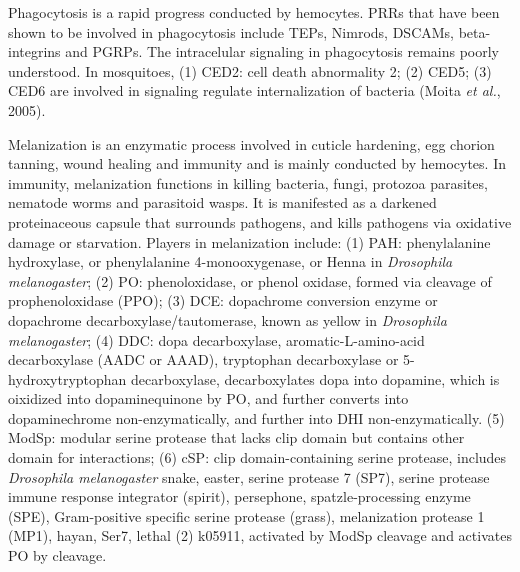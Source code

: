 \documentclass[11pt]{article}
\begin{document}
\begin{sloppypar}
Phagocytosis is a rapid progress conducted by hemocytes. 
PRRs that have been shown to be involved in phagocytosis include TEPs, Nimrods, DSCAMs, beta-integrins and PGRPs. 
The intracelular signaling in phagocytosis remains poorly understood. 
In mosquitoes, 
\newline
(1) CED2: cell death abnormality 2; \newline
(2) CED5; \newline
(3) CED6 \newline 
are involved in signaling regulate internalization of bacteria (Moita \textit{et al.}, 2005). 
\par
Melanization is an enzymatic process involved in cuticle hardening, egg chorion tanning, wound healing and immunity and is mainly conducted by hemocytes. 
In immunity, melanization functions in killing bacteria, fungi, protozoa parasites, nematode worms and parasitoid wasps. 
It is manifested as a darkened proteinaceous capsule that surrounds pathogens, and kills pathogens via oxidative damage or starvation. 
Players in melanization include:
\newline
(1) PAH: phenylalanine hydroxylase, or phenylalanine 4-monooxygenase, or Henna in \textit{Drosophila melanogaster}; \newline
(2) PO: phenoloxidase, or phenol oxidase, formed via cleavage of prophenoloxidase (PPO); \newline
(3) DCE: dopachrome conversion enzyme or dopachrome decarboxylase/tautomerase, known as yellow in \textit{Drosophila melanogaster}; \newline
(4) DDC: dopa decarboxylase, aromatic-L-amino-acid decarboxylase (AADC or AAAD), tryptophan decarboxylase or 5-hydroxytryptophan decarboxylase, decarboxylates dopa into dopamine, which is oixidized into dopaminequinone by PO, and further converts into dopaminechrome non-enzymatically, and further into DHI non-enzymatically. \newline 
(5) ModSp: modular serine protease that lacks clip domain but contains other domain for interactions; \newline
(6) cSP: clip domain-containing serine protease, includes \textit{Drosophila melanogaster} 
  snake, easter, serine protease 7 (SP7), serine protease immune response integrator (spirit), persephone, spatzle-processing enzyme (SPE), Gram-positive specific serine protease (grass), melanization protease 1 (MP1), hayan, Ser7, lethal (2) k05911, 
activated by ModSp cleavage and activates PO by cleavage. \newline

\end{sloppypar}
\end{document}
